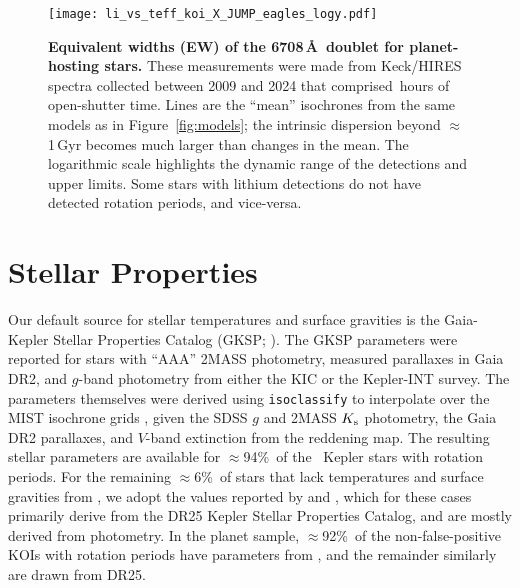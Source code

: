 \documentclass[11pt,twocolumn,tighten]{aastex63}
\newcommand{\fracstarswithprotwithbtwenty}{{$\approx$94\%}}
\newcommand{\fracstarswithprotwithoutbtwenty}{{$\approx$6\%}}
\newcommand{\frackoisnofpwithprotwithbtwenty}{{$\approx$92\%}}
\begin{document}
\begin{figure}[!t]
	\begin{center}
		\leavevmode
		\texttt{[image: li\_vs\_teff\_koi\_X\_JUMP\_eagles\_logy.pdf]}
	\end{center}
	\vspace{-0.6cm}
	\caption{
		{\bf Equivalent widths (EW) of the  6708\,\AA\ doublet
			for planet-hosting stars.} These measurements were made from
		Keck/HIRES spectra collected between 2009 and 2024 that comprised
		\nhireshours\,hours of open-shutter time.  Lines are the ``mean''
		isochrones from the same models as in Figure~\ref{fig:models}; the
		intrinsic dispersion beyond $\approx$1\,Gyr becomes much larger
		than changes in the mean.  The logarithmic scale highlights the
		dynamic range of the detections and upper limits.  Some stars with
		lithium detections do not have detected rotation periods, and
		vice-versa.
		\label{fig:li_vs_teff}
	}
\end{figure}



\section{Stellar Properties}
\label{sec:stellarprops}




Our default source for stellar temperatures and surface gravities is
the Gaia-Kepler Stellar Properties Catalog (GKSP;
\citealt{Berger_2020a_catalog}).  The GKSP parameters were reported
for stars with ``AAA'' 2MASS photometry, measured parallaxes in Gaia
DR2,  and $g$-band photometry from either the KIC or the Kepler-INT
survey.  The parameters themselves were derived using
\texttt{isoclassify} \citep{2017ApJ...844..102H} to interpolate over
the MIST isochrone grids
\citep{Choi_2016,2016ApJS..222....8D}, given the SDSS $g$
and 2MASS $K_{\rm s}$ photometry, the Gaia DR2 parallaxes, and
$V$-band extinction from the \citet{2018MNRAS.478..651G} reddening
map.  The resulting stellar parameters are available for
\fracstarswithprotwithbtwenty\ of the \nuniqstarsantosrot\ Kepler
stars with rotation periods.  For the remaining
\fracstarswithprotwithoutbtwenty\ of stars that lack temperatures and
surface gravities from , we adopt the
values reported by \citet{Santos_2019} and \citet{Santos_2021}, which
for these cases primarily derive from the \citet{Mathur_2017} DR25
Kepler Stellar Properties Catalog, and are mostly derived from
photometry.  In the planet sample, \frackoisnofpwithprotwithbtwenty\
of the non-false-positive KOIs with rotation periods have parameters
from \citet{Berger_2020a_catalog}, and the remainder similarly are
drawn from DR25. 
\end{document}
